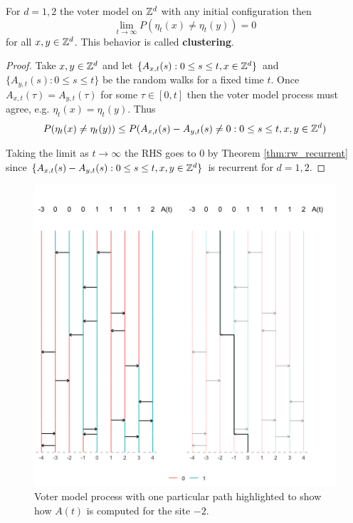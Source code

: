 \begin{theorem}
For $d = 1,2$ the voter model on $\mathbb{Z}^d$ with any initial configuration then
$$
\lim_{t \to \infty} P(\eta_t(x) \not = \eta_t(y)) = 0
$$
for all $x,y \in \mathbb{Z}^d$.
This behavior is called \textbf{clustering}.
\end{theorem}

\begin{proof}
Take $x, y \in \mathbb{Z}^d$ and let $\{A_{x,t}(s) : 0 \leq s \leq t, x \in \mathbb{Z}^d\}$ and $\{A_{y,t}(s) : 0 \leq s \leq t\}$ be the random walks for a fixed time $t$.
Once $A_{x,t}(\tau) = A_{y,t}(\tau)$ for some $\tau \in [0, t]$ then the voter model process must agree, e.g. $\eta_t(x) = \eta_t(y)$.
Thus
\begin{align*}
P(\eta_t(x) \not = \eta_t(y)) \leq P(A_{x,t}(s) - A_{y,t}(s) \not = 0 : 0 \leq s \leq t, x,y \in \mathbb{Z}^d)
\end{align*}


Taking the limit as $t \to \infty$ the RHS goes to 0 by Theorem \ref{thm:rw_recurrent} since $\{A_{x,t}(s) - A_{y,t}(s) : 0 \leq s \leq t, x,y \in \mathbb{Z}^d\}$ is recurrent for $d = 1,2$.
\end{proof}

\begin{figure}[H]
  \centering
    \includegraphics[width=1\textwidth]{figures/voter_model_dual.png}
   \caption{Voter model process with one particular path highlighted to show how $A(t)$ is computed for the site $-2$.}
  \label{fig:voter_model_dual}
\end{figure}

